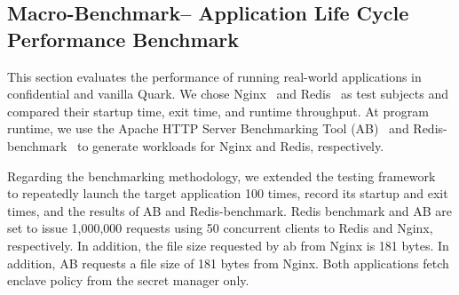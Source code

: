 










\subsection{Macro-Benchmark– Application Life Cycle Performance Benchmark}\label{macri_app_start_up}

This section evaluates the performance of running real-world applications in confidential and vanilla Quark. We chose Nginx~\cite*{nginx} and Redis~\cite*{redis} as test subjects and compared their startup time, exit time, and runtime throughput. At program runtime, we use the Apache HTTP Server 
Benchmarking Tool (AB)~\cite*{ab} and Redis-benchmark~\cite*{Redis_benchmark} to generate workloads for Nginx and Redis, respectively.

Regarding the benchmarking methodology, we extended the testing framework~\cite*{benchamark_framework} to repeatedly launch the target application 100 times, record its startup and exit times, and the results of AB and Redis-benchmark. Redis benchmark and AB
 are set to issue 1,000,000 requests using 50 concurrent clients to Redis and Nginx, respectively. In addition, the file size requested by ab from Nginx is 181 bytes. In addition, AB requests a file size of 181 bytes from Nginx. Both applications fetch enclave policy from the secret manager only.


